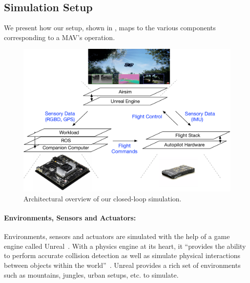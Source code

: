 {


\subsection{Simulation Setup}
\label{sec:setup}

We present how our setup, shown in , maps to the various components corresponding to a MAV's operation.

\begin{figure}[t!]
\centering
\includegraphics[trim= 10 10 10 10, clip, width=0.75\columnwidth]{figs/end-to-end-simulation}
\caption{Architectural overview of our closed-loop simulation. 
}
\label{fig:end-to-end}
\end{figure}

\paragraph{Environments, Sensors and Actuators:} Environments, sensors and actuators are simulated with the help of a game engine called Unreal~\cite{GameEngi70:online}. With a physics engine at its heart, it ``provides the ability to perform accurate collision detection as well as simulate physical interactions between objects within the world''~\cite{PhysicsS8:online}. Unreal provides a rich set of environments such as mountains, jungles, urban setups, etc. to simulate.

}
